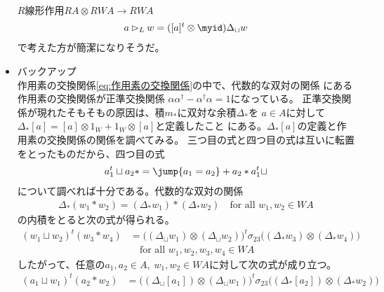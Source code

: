 \begin{itemize}
\begin{equation*}
\begin{array}{lll}
		\end{array}\end{equation*} %
		$R$線形作用$RA\otimes RWA\to RWA$
		\begin{equation*}\begin{split} %
			a\rhd_L w = ([a]^t\otimes \myid)\Delta_\sqcup w
		\end{split}\end{equation*} %
		で考えた方が簡潔になりそうだ。
		\item バックアップ\\
		作用素の交換関係\eqref{eq:作用素の交換関係}の中で、代数的な双対の関係
		にある作用素の交換関係が正準交換関係
		$\alpha\alpha^\dag-\alpha^\dag\alpha=1$になっている。
		正準交換関係が現れたそもそもの原因は、積$m_*$に双対な余積$\Delta_*$を
		$a\in A$に対して$\Delta_*[a]=[a]\otimes 1_W+1_W\otimes [a]$と定義したこと
		にある。$\Delta_*[a]$の定義と作用素の交換関係の関係を調べてみる。
		三つ目の式と四つ目の式は互いに転置をとったものだから、四つ目の式
		\begin{equation}\label{eq:調べる交換関係}\begin{split} %
			a_1^t\sqcup a_2* &= \jump{a_1=a_2} + a_2* a_1^t\sqcup \\
		\end{split}\end{equation} %
		について調べれば十分である。代数的な双対の関係
		\begin{equation*}\begin{split} %
			\Delta_*(w_1* w_2) = (\Delta_*w_1)*(\Delta_*w_2)
			\quad\text{for all }w_1,w_2\in WA
		\end{split}\end{equation*} %
		の内積をとると次の式が得られる。
		\begin{equation*}\begin{split} %
			(w_1\sqcup w_2)^t(w_3* w_4) 
			&= \bigl((\Delta_\sqcup w_1)\otimes(\Delta_\sqcup w_2)\bigr)^t
				\sigma_{23}\bigl((\Delta_*w_3)\otimes(\Delta_*w_4)\bigr) \\
			& \quad\text{for all }w_1,w_2,w_3,w_4\in WA
		\end{split}\end{equation*} %
		したがって、任意の$a_1,a_2\in A,\;w_1,w_2\in WA$に対して次の式が成り立つ。
		\begin{equation}\label{eq:交換関係を導くための双対性}\begin{split} %
			(a_1\sqcup w_1)^t(a_2* w_2) 
			&= \bigl((\Delta_\sqcup[a_1])\otimes(\Delta_\sqcup w_1)\bigr)^t
				\sigma_{23}\bigl((\Delta_*[a_2])\otimes(\Delta_*w_2)\bigr) \\

\end{split}
\end{equation}
\end{itemize}
